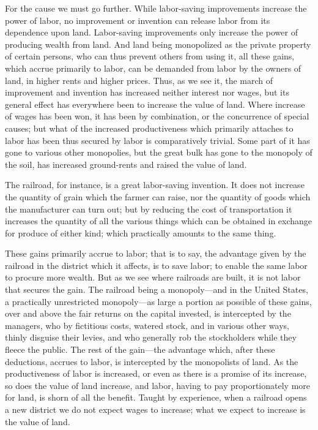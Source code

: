 \documentclass{book}
\begin{document}
For the cause we must go further. While labor-saving improvements increase the power of labor, no improvement or invention can release labor from its dependence upon land. Labor-saving improvements only increase the power of producing wealth from land. And land being monopolized as the private property of certain persons, who can thus prevent others from using it, all these gains, which accrue primarily to labor, can be demanded from labor by the owners of land, in higher rents and higher prices. Thus, as we see it, the march of improvement and invention has increased neither interest nor wages, but its general effect has everywhere been to increase the value of land. Where increase of wages has been won, it has been by combination, or the concurrence of special causes; but what of the increased productiveness which primarily attaches to labor has been thus secured by labor is comparatively trivial. Some part of it has gone to various other monopolies, but the great bulk has gone to the monopoly of the soil, has increased ground-rents and raised the value of land.

The railroad, for instance, is a great labor-saving invention. It does not increase the quantity of grain which the farmer can raise, nor the quantity of goods which the manufacturer can turn out; but by reducing the cost of transportation it increases the quantity of all the various things which can be obtained in exchange for produce of either kind; which practically amounts to the same thing.

These gains primarily accrue to labor; that is to say, the advantage given by the railroad in the district which it affects, is to save labor; to enable the same labor to procure more wealth. But as we see where railroads are built, it is not labor that secures the gain. The railroad being a monopoly—and in the United States, a practically unrestricted monopoly—as large a portion as possible of these gains, over and above the fair returns on the capital invested, is intercepted by the managers, who by fictitious costs, watered stock, and in various other ways, thinly disguise their levies, and who generally rob the stockholders while they fleece the public. The rest of the gain—the advantage which, after these deductions, accrues to labor, is intercepted by the monopolists of land. As the productiveness of labor is increased, or even as there is a promise of its increase, so does the value of land increase, and labor, having to pay proportionately more for land, is shorn of all the benefit. Taught by experience, when a railroad opens a new district we do not expect wages to increase; what we expect to increase is the value of land.
\end{document}
